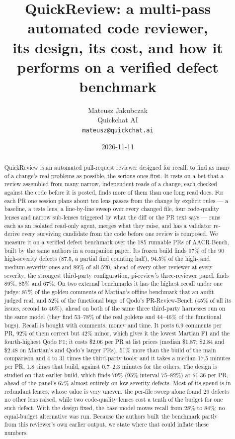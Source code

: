 \documentclass[11pt,a4paper]{article}
\title{QuickReview: a multi-pass automated code reviewer,\\
\large its design, its cost, and how it performs on a verified defect benchmark}
\author{Mateusz Jakubczak \\ Quickchat AI \\ \texttt{mateusz@quickchat.ai}}
\date{2026-11-11}
\begin{document}
\maketitle

\begin{abstract}
QuickReview is an automated pull-request reviewer designed for recall: to
find as many of a change's real problems as possible, the serious ones
first. It rests on a bet that a review assembled from many narrow,
independent reads of a change, each checked against the code before it is
posted, finds more of them than one long read does. For each PR one session
plans about ten lens passes from the change by explicit rules --- a
baseline, a tests lens, a line-by-line sweep over every changed file, four
code-quality lenses and narrow sub-lenses triggered by what the diff or the
PR text says --- runs each as an isolated read-only agent, merges what they
raise, and has a validator re-derive every surviving candidate from the
code before one review is composed. We measure it on a verified defect
benchmark over the 185 runnable PRs of AACR-Bench, built by the same authors
in a companion paper. Its frozen build finds 97\% of the 90 high-severity
defects (87.5, a partial find counting half), 94.5\% of the high- and
medium-severity ones and 89\% of all 520, ahead of every other reviewer at
every severity; the strongest third-party configuration, pi-review's
three-reviewer panel, finds 89\%, 85\% and 67\%. On two external benchmarks
it has the highest recall under one judge: 87\% of the golden comments of
Martian's offline benchmark that an audit judged real, and 52\% of the
functional bugs of Qodo's PR-Review-Bench (45\% of all its issues, second
to 46\%), ahead on both of the same three third-party harnesses run on the
same model (they find 53--78\% of the real goldens and 44--46\% of the
functional bugs). Recall is bought with comments,
money and time. It posts 6.9 comments per PR, 92\% of them correct but 42\%
minor, which gives it the lowest Martian F1 and the fourth-highest Qodo F1;
it costs \$2.06 per PR at list prices (median \$1.87; \$2.84 and \$2.48 on
Martian's and Qodo's larger PRs), 51\% more than the build of the main
comparison and 4 to 31 times the third-party tools; and
it takes a median 17.5 minutes per PR, 1.8 times that build, against 0.7--2.3
minutes for the others. The design is studied on that earlier build, which
finds 79\% (95\% interval 75--82\%) at \$1.36 per PR, ahead of the panel's
67\% almost entirely on low-severity defects. Most of its spend is in
redundant lenses, whose value is very uneven: the per-file sweep alone found
29 defects no other lens raised, while two code-quality lenses cost a tenth
of the budget for one such defect. With the design fixed, the base model
moves recall from 28\% to 84\%; no equal-budget alternative was run.
Because the authors built the benchmark partly from this reviewer's own
earlier output, we state where that could inflate these numbers.
\end{abstract}
\end{document}
